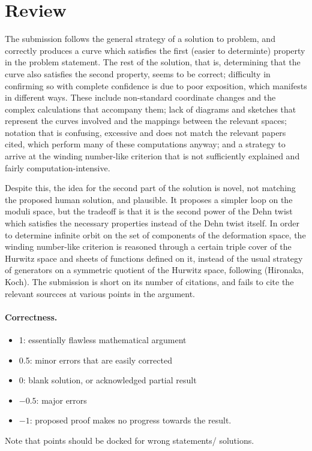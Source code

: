 \documentclass[11pt]{article}
\theoremstyle{remark}
\begin{document}
\maketitle

\section{Review}

The submission follows the general strategy of a solution to problem, and correctly produces a curve which satisfies the first (easier to determinte) property in the problem statement. The rest of the solution, that is, determining that the curve also satisfies the second property, seems to be correct; difficulty in confirming so with complete confidence is due to poor exposition, which manifests in different ways. These include non-standard coordinate changes and the complex calculations that accompany them; lack of diagrams and sketches that represent the curves involved and the mappings between the relevant spaces; notation that is confusing, excessive and does not match the relevant papers cited, which perform many of these computations anyway; and a strategy to arrive at the winding number-like criterion that is not sufficiently explained and fairly computation-intensive.

Despite this, the idea for the second part of the solution is novel, not matching the proposed human solution, and plausible. It proposes a simpler loop on the moduli space, but the tradeoff is that it is the second power of the Dehn twist which satisfies the necessary properties instead of the Dehn twist itself. In order to determine infinite orbit on the set of components of the deformation space, the winding number-like criterion is reasoned through a certain triple cover of the Hurwitz space and sheets of functions defined on it, instead of the usual strategy of generators on a symmetric quotient of the Hurwitz space, following (Hironaka, Koch). The submission is short on its number of citations, and fails to cite the relevant sourcces at various points in the argument.

\paragraph{Correctness.}
\begin{itemize}
	\item  1: essentially flawless mathematical argument
	\item  0.5: minor errors that are easily corrected
	\item  0: blank solution, or acknowledged partial result
	\item  $-0.5$: major errors
	\item  $-1$: proposed proof makes no progress towards the result.
\end{itemize}
Note that points should be docked for wrong statements/ solutions.
\end{document}
